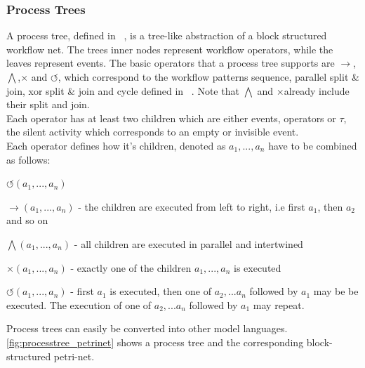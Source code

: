 \documentclass[
	a4paper,
	pagesize,
	pdftex,
	12pt,
	twoside, %
	BCOR=5mm, %
	ngerman,
	fleqn,
	final,
	]{scrartcl}
\begin{document}
\subsubsection{Process Trees}
A process tree, defined in ~\cite{ProcessTree}, is a tree-like abstraction of a block structured workflow net. The trees inner nodes represent workflow operators, while the leaves represent events. The basic operators that a process tree supports are $\rightarrow$,$\bigwedge$,$\times$ and $\circlearrowleft$, which correspond to the workflow patterns sequence, parallel split \& join, xor split \& join and cycle defined in ~\cite{workflowpatterns}. Note that $\bigwedge$ and $\times$already include their split and join.\\
Each operator has at least two children which are either events, operators or $\tau$, the silent activity which corresponds to an empty or invisible event.\\
Each operator defines how it's children, denoted as $a_1,...,a_n$ have to be combined as follows:
\begin{labeling}{$\circlearrowleft(a_1,...,a_n)$}
\item [$\rightarrow(a_1,...,a_n)$] - the children are executed from left to right, i.e first $a_1$, then $a_2$ and so on
\item [$\bigwedge(a_1,...,a_n)$] - all children are executed in parallel and intertwined
\item [$\times(a_1,...,a_n)$] - exactly one of the children $a_1,...,a_n$ is executed
\item [$\circlearrowleft(a_1,...,a_n)$] - first $a_1$ is executed, then one of $a_2,...a_n$ followed by $a_1$ may be be executed. The execution of one of $a_2,...a_n$ followed by $a_1$ may repeat.
\end{labeling}
Process trees can easily be converted into other model languages.
\ref{fig:processtree_petrinet} shows a process tree and the corresponding block-structured petri-net.
\end{document}
